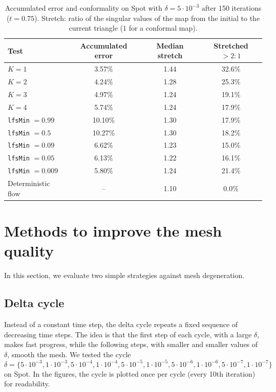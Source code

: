 \documentclass[
]{elteiktdk}[2024/04/26]
\begin{document}
	\begin{table}[H]
		\centering
		\begin{tabular}{l c c c}
			\hline
			Test & Accumulated error & Median stretch & Stretched $>2{:}1$ \\
			\hline
			$K = 1$ & 3.57\% & 1.44 & 32.6\% \\
			$K = 2$ & 4.24\% & 1.28 & 25.3\% \\
			$K = 3$ & 4.97\% & 1.24 & 19.1\% \\
			$K = 4$ & 5.74\% & 1.24 & 17.9\% \\
			\hline
			\texttt{lfsMin} $= 0.99$  & 10.10\% & 1.30 & 17.9\% \\
			\texttt{lfsMin} $= 0.5$   & 10.27\% & 1.30 & 18.2\% \\
			\texttt{lfsMin} $= 0.09$  & 6.62\%  & 1.23 & 15.0\% \\
			\texttt{lfsMin} $= 0.05$  & 6.13\%  & 1.22 & 16.1\% \\
			\texttt{lfsMin} $= 0.009$ & 5.80\%  & 1.24 & 21.4\% \\
			\hline
			Deterministic flow & -- & 1.10 & 0.0\% \\
			\hline
		\end{tabular}
		\caption{Accumulated error and conformality on Spot with $\delta = 5\cdot10^{-3}$ after 150 iterations ($t = 0.75$). Stretch: ratio of the singular values of the map from the initial to the current triangle ($1$ for a conformal map).}
		\label{tab:global_K_lfs}
	\end{table}
	
	\section{Methods to improve the mesh quality}
	
	In this section, we evaluate two simple strategies against mesh degeneration.
	
	\subsection{Delta cycle}
	
	Instead of a constant time step, the delta cycle repeats a fixed sequence of decreasing time steps. The idea is that the first step of each cycle, with a large $\delta$, makes fast progress, while the following steps, with smaller and smaller values of $\delta$, smooth the mesh. We tested the cycle
	\begin{equation}
		\delta = \{5 \cdot 10^{-3}, 1 \cdot 10^{-3}, 5 \cdot 10^{-4}, 1 \cdot 10^{-4}, 5 \cdot 10^{-5}, 1 \cdot 10^{-5}, 5 \cdot 10^{-6}, 1 \cdot 10^{-6}, 5 \cdot 10^{-7}, 1 \cdot 10^{-7}\}
	\end{equation}
	on Spot. In the figures, the cycle is plotted once per cycle (every 10th iteration) for readability.
	
\end{document}

